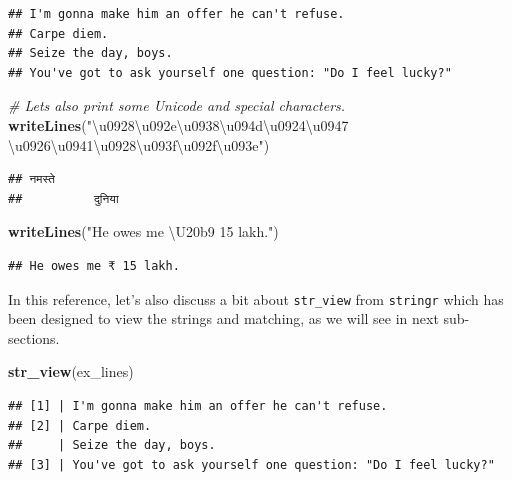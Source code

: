 \documentclass[
]{book}
\newenvironment{Shaded}{\begin{snugshade}}{\end{snugshade}}
\newcommand{\CommentTok}[1]{\textcolor[rgb]{0.56,0.35,0.01}{\textit{#1}}}
\newcommand{\FunctionTok}[1]{\textcolor[rgb]{0.13,0.29,0.53}{\textbf{#1}}}
\newcommand{\NormalTok}[1]{#1}
\newcommand{\StringTok}[1]{\textcolor[rgb]{0.31,0.60,0.02}{#1}}
\begin{document}
\begin{verbatim}
## I'm gonna make him an offer he can't refuse.
## Carpe diem.
## Seize the day, boys.
## You've got to ask yourself one question: "Do I feel lucky?"
\end{verbatim}

\begin{Shaded}
\begin{Highlighting}[]
\CommentTok{\# Let\textquotesingle{}s also print some Unicode and special characters.}
\FunctionTok{writeLines}\NormalTok{(}\StringTok{"\textbackslash{}u0928\textbackslash{}u092e\textbackslash{}u0938\textbackslash{}u094d\textbackslash{}u0924\textbackslash{}u0947 }
\StringTok{         \textbackslash{}u0926\textbackslash{}u0941\textbackslash{}u0928\textbackslash{}u093f\textbackslash{}u092f\textbackslash{}u093e"}\NormalTok{)}
\end{Highlighting}
\end{Shaded}

\begin{verbatim}
## नमस्ते 
##          दुनिया
\end{verbatim}

\begin{Shaded}
\begin{Highlighting}[]
\FunctionTok{writeLines}\NormalTok{(}\StringTok{"He owes me \textbackslash{}U20b9 15 lakh."}\NormalTok{)}
\end{Highlighting}
\end{Shaded}

\begin{verbatim}
## He owes me ₹ 15 lakh.
\end{verbatim}

In this reference, let's also discuss a bit about \texttt{str\_view} from \texttt{stringr} which has been designed to view the strings and matching, as we will see in next sub-sections.

\begin{Shaded}
\begin{Highlighting}[]
\FunctionTok{str\_view}\NormalTok{(ex\_lines)}
\end{Highlighting}
\end{Shaded}

\begin{verbatim}
## [1] | I'm gonna make him an offer he can't refuse.
## [2] | Carpe diem.
##     | Seize the day, boys.
## [3] | You've got to ask yourself one question: "Do I feel lucky?"
\end{verbatim}
\end{document}
